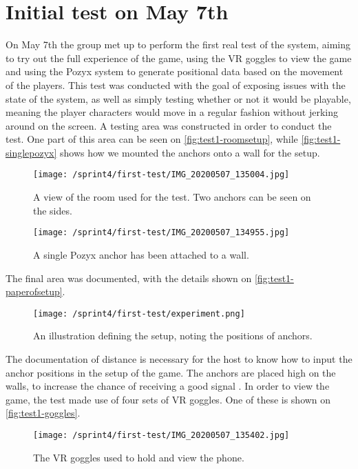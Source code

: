 \section{Initial test on May 7th}\label{sec:initial-test}
On May 7th the group met up to perform the first real test of the system, aiming to try out the full experience of the game, using the VR goggles to view the game and using the Pozyx system to generate positional data based on the movement of the players.
This test was conducted with the goal of exposing issues with the state of the system, as well as simply testing whether or not it would be playable, meaning the player characters would move in a regular fashion without jerking around on the screen.
A testing area was constructed in order to conduct the test.
One part of this area can be seen on \autoref{fig:test1-roomsetup}, while \autoref{fig:test1-singlepozyx} shows how we mounted the anchors onto a wall for the setup.
\begin{figure}[]
    \centering
    \texttt{[image: /sprint4/first-test/IMG\_20200507\_135004.jpg]}
    \caption{A view of the room used for the test. Two anchors can be seen on the sides.}
    \label{fig:test1-roomsetup}
\end{figure}
\begin{figure}[]
    \centering
    \texttt{[image: /sprint4/first-test/IMG\_20200507\_134955.jpg]}
    \caption{A single Pozyx anchor has been attached to a wall.}
    \label{fig:test1-singlepozyx}
\end{figure}
\noindent
The final area was documented, with the details shown on \autoref{fig:test1-paperofsetup}.
\begin{figure}[h!]
    \centering
    \texttt{[image: /sprint4/first-test/experiment.png]}
    \caption{An illustration defining the setup, noting the positions of anchors.}
    \label{fig:test1-paperofsetup}
\end{figure}
\noindent
The documentation of distance is necessary for the host to know how to input the anchor positions in the setup of the game.
The anchors are placed high on the walls, to increase the chance of receiving a good signal \cite{pozyx-AnchorHeights}.
In order to view the game, the test made use of four sets of VR goggles.
One of these is shown on \autoref{fig:test1-goggles}.
\begin{figure}[]
    \centering
    \texttt{[image: /sprint4/first-test/IMG\_20200507\_135402.jpg]}
    \caption{The VR goggles used to hold and view the phone.}
    \label{fig:test1-goggles}
\end{figure}
\noindent

